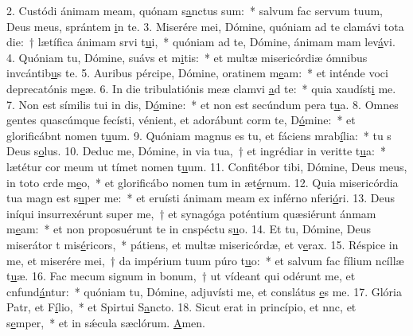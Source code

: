2. Custódi ánimam meam, quónam s\uline{a}nctus sum:~* salvum fac servum tuum, Deus meus, sprántem \uline{i}n te.
3. Miserére mei, Dómine, quóniam ad te clamávi tota die:~† lætífica ánimam srvi t\uline{u}i,~* quóniam ad te, Dómine, ánimam mam lev\uline{á}vi.
4. Quóniam tu, Dómine, suávs et m\uline{i}tis:~* et multæ misericórdiæ ómnibus invcántib\uline{u}s te.
5. Auribus pércipe, Dómine, oratinem m\uline{e}am:~* et inténde voci deprecatónis m\uline{e}æ.
6. In die tribulatiónis meæ clamvi \uline{a}d te:~* quia xaudíst\uline{i} me.
7. Non est símilis tui in dis, D\uline{ó}mine:~* et non est secúndum pera t\uline{u}a.
8. Omnes gentes quascúmque fecísti, vénient, et adorábunt corm te, D\uline{ó}mine:~* et glorificábnt nomen t\uline{u}um.
9. Quóniam magnus es tu, et fáciens mrab\uline{í}lia:~* tu s Deus s\uline{o}lus.
10. Deduc me, Dómine, in via tua,~† et ingrédiar in veritte t\uline{u}a:~* lætétur cor meum ut tímet nomen t\uline{u}um.
11. Confitébor tibi, Dómine, Deus meus, in toto crde m\uline{e}o,~* et glorificábo nomen tum in æt\uline{é}rnum.
12. Quia misericórdia tua magn est s\uline{u}per me:~* et eruísti ánimam meam ex inférno nferi\uline{ó}ri.
13. Deus iníqui insurrexérunt super me,~† et synagóga poténtium quæsiérunt ánmam m\uline{e}am:~* et non proposuérunt te in cnspéctu s\uline{u}o.
14. Et tu, Dómine, Deus miserátor t mis\uline{é}ricors,~* pátiens, et multæ misericórdæ, et v\uline{e}rax.
15. Réspice in me, et miserére mei,~† da impérium tuum púro t\uline{u}o:~* et salvum fac fílium ncíllæ t\uline{u}æ.
16. Fac mecum signum in bonum,~† ut vídeant qui odérunt me, et cnfund\uline{á}ntur:~* quóniam tu, Dómine, adjuvísti me, et conslátus \uline{e}s me.
17. Glória Patr, et F\uline{í}lio,~* et Spirtui S\uline{a}ncto.
18. Sicut erat in princípio, et nnc, et s\uline{e}mper,~* et in sǽcula sæclórum. \uline{A}men.

